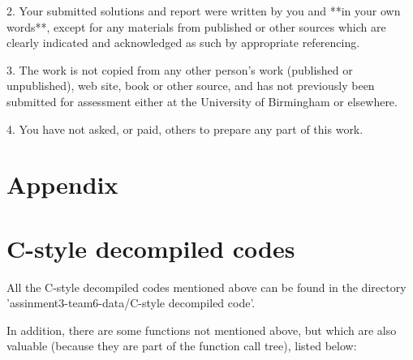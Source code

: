 \documentclass[11pt]{article}
\begin{document}
2. Your submitted solutions and report were written by you and **in your own words**, except for any materials from published or other sources which are clearly indicated and acknowledged as such by appropriate referencing.

3. The work is not copied from any other person's work (published or unpublished), web site, book or other source, and has not previously been submitted for assessment either at the University of Birmingham or elsewhere.

4. You have not asked, or paid, others to prepare any part of this work.

\newpage
\appendix
\section*{Appendix}


\section{C-style decompiled codes}
All the C-style decompiled codes mentioned above can be found in the
directory\\'assinment3-team6-data/C-style decompiled code'.

In addition, there are some functions not mentioned above, but which are also
valuable (because they are part of the function call tree), listed below:
\end{document}
